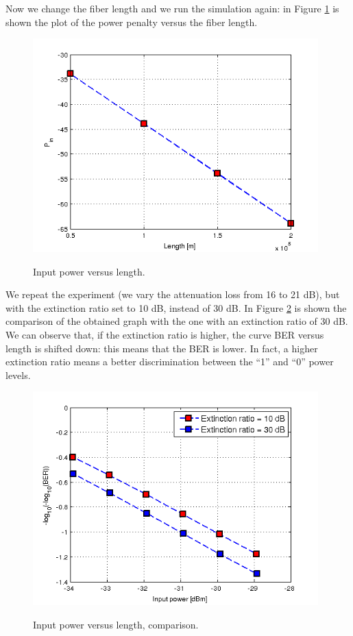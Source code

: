 \documentclass[a4paper,10pt]{report}
\begin{document}
\newpage
Now we change the fiber length and we run the simulation again: in Figure \ref{ex6_4} is shown the plot of the power penalty versus
the fiber length.

\begin{figure}[!ht]
   \centering
   \includegraphics[width=11cm]{ex6_4.png}\\
   \caption{Input power versus length.}
   \label{ex6_4}
\end{figure}

We repeat the experiment (we vary the attenuation loss from 16 to 21 dB), but with the extinction ratio set to 10 dB, instead of 30 dB.
In Figure \ref{ex6_5} is shown the comparison of the obtained graph with the one with an extinction ratio of 30 dB.
We can observe that, if the extinction ratio is higher, the curve BER versus length is shifted down: this means that the BER is lower.
In fact, a higher extinction ratio means a better discrimination between the ``1'' and ``0'' power levels.

\begin{figure}[!ht]
   \centering
   \includegraphics[width=11cm]{ex6_5.png}\\
   \caption{Input power versus length, comparison.}
   \label{ex6_5}
\end{figure}
\end{document}
